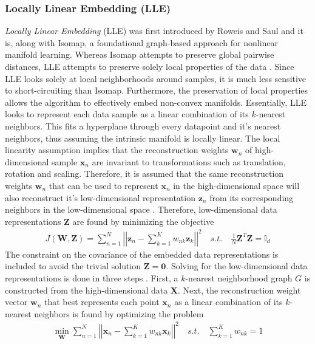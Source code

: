 \subsubsection{Locally Linear Embedding (LLE)} \label{sec:LLE}
\textit{Locally Linear Embedding} (LLE) was first introduced by Roweis and Saul \citep{Roweis2000LLE} and it is, along with Isomap, a foundational graph-based approach for nonlinear manifold learning.  Whereas Isomap attempts to preserve global pairwise distances, LLE attempts to preserve solely local properties of the data \citep{VanDerMaaten2009DRReview}.  Since LLE looks solely at local neighborhoods around samples, it is much less sensitive to short-circuiting than Isomap.  Furthermore, the preservation of local properties allows the algorithm to effectively embed non-convex manifolds.  Essentially, LLE looks to represent each data sample as a linear combination of its $k$-nearest neighbors.  This fits a hyperplane through every datapoint and it's nearest neighbors, thus assuming the intrinsic manifold is locally linear.  The local linearity assumption implies that the reconstruction weights $\bm{w}_{n}$ of high-dimensional sample $\bm{x}_{n}$ are invariant to transformations such as translation, rotation and scaling.  Therefore, it is assumed that the same reconstruction weights $\bm{w}_{n}$ that can be used to represent $\bm{x}_{n}$ in the high-dimensional space will also reconstruct it's low-dimensional representation $\bm{z}_{n}$ from its corresponding neighbors in the low-dimensional space \citep{Roweis2000LLE, Sorzano2014DRReview, Chao2019RecentAdvancesSupervisedDimRed}.  Therefore, low-dimensional data representations $\bm{Z}$ are found by minimizing the objective
\begin{align} \label{eq:LLE_objective}
	J(\bm{W},\bm{Z}) = \sum_{n=1}^{N} \left | \left | \bm{z}_{n} - \sum_{k=1}^{K}w_{nk}\bm{z}_{k} \right | \right |^{2} \quad s.t. \quad \frac{1}{N}\bm{Z}^{T}\bm{Z}=\bm{\mathbb{I}}_{d}
\end{align} 
\noindent
The constraint on the covariance of the embedded data representations is included to avoid the trivial solution $\bm{Z} = \bm{0}$.  Solving for the low-dimensional data representations is done in three steps \citep{Thorstensen2009ManifoldThesis}.  First, a $k$-nearest neighborhood graph $G$ is constructed from the high-dimensional data $\bm{X}$.  Next, the reconstruction weight vector $\bm{w}_{n}$ that best represents each point  $\bm{x}_{n}$ as a linear combination of its $k$-nearest neighbors is found by optimizing the problem
\begin{align} \label{eq:LLE_Weight_Equation}
	\min_{\bm{W}}\sum_{n=1}^{N} \left | \left | \bm{x}_{n} - \sum_{k=1}^{K}w_{nk}\bm{x}_{k} \right | \right |^{2} \quad s.t. \quad \sum_{k=1}^{K}w_{nk} =1
\end{align}
